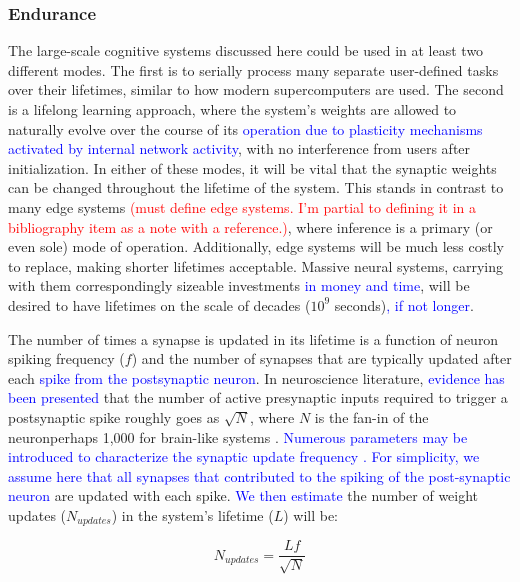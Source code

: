 \documentclass[twocolumn]{article}
\begin{document}
\subsubsection{Endurance}
The large-scale cognitive systems discussed here could be used in at least two different modes. The first is to serially process many separate user-defined tasks over their lifetimes, similar to how modern supercomputers are used. The second is a lifelong learning approach, where the system's weights are allowed to naturally evolve over the course of its \textcolor{blue}{operation due to plasticity mechanisms activated by internal network activity}, with no interference from users after initialization. In either of these modes, it will be vital that the synaptic weights can be changed throughout the lifetime of the system. This stands in contrast to many edge systems \textcolor{red}{(must define edge systems. I'm partial to defining it in a bibliography item as a note with a reference.)}, where inference is a primary (or even sole) mode of operation. Additionally, edge systems will be much less costly to replace, making shorter lifetimes acceptable. Massive neural systems, carrying with them correspondingly sizeable investments \textcolor{blue}{in money and time}, will be desired to have lifetimes on the scale of decades ($10^9$ seconds)\textcolor{blue}{, if not longer}.

The number of times a synapse is updated in its lifetime is a function of neuron spiking frequency ($f$) and the number of synapses that are typically updated after each \textcolor{blue}{spike from the postsynaptic neuron}. In neuroscience literature, \textcolor{blue}{evidence has been presented} that the number of active presynaptic inputs required to trigger a postsynaptic spike roughly goes as $\sqrt{N}$, where $N$ is the fan-in of the neuron\textemdash perhaps 1,000 for brain-like systems \cite{vrso1996,vora2005}. \textcolor{blue}{Numerous parameters may be introduced to characterize the synaptic update frequency \cite{fuab2007}. For simplicity, we assume here that all synapses that contributed to the spiking of the post-synaptic neuron} are updated with each spike. \textcolor{blue}{We then estimate} the number of weight updates ($N_{updates}$) in the system's lifetime ($L$) will be:

\begin{equation}
    N_{updates} = \frac{Lf}{\sqrt{N}}
\end{equation}
\end{document}
